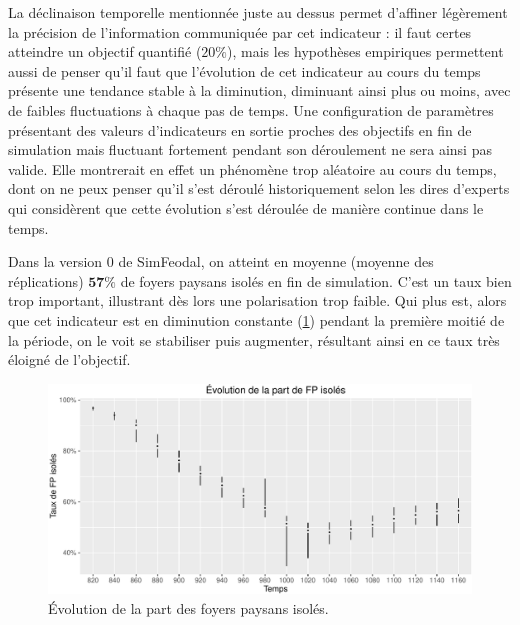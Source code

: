 La \og déclinaison temporelle\fg{} mentionnée juste au dessus permet d'affiner légèrement la précision de l'information communiquée par cet indicateur : il faut certes atteindre un objectif quantifié ($20\%$), mais les hypothèses empiriques permettent aussi de penser qu'il faut que l'évolution de cet indicateur au cours du temps présente une tendance stable à la diminution, diminuant ainsi plus ou moins, avec de faibles fluctuations à chaque pas de temps.
Une configuration de paramètres présentant des valeurs d'indicateurs en sortie proches des objectifs en fin de simulation mais fluctuant fortement pendant son déroulement ne sera ainsi pas valide. Elle montrerait en effet  un phénomène trop aléatoire au cours du temps, dont on ne peux penser qu'il s'est déroulé historiquement selon les dires d'experts qui considèrent que cette évolution s'est déroulée de manière continue dans le temps.

\begin{mdframed}[backgroundcolor=gray!10,footnoteinside=false]
	
	
	Dans la version 0 de SimFeodal, on atteint en moyenne (moyenne des réplications) $\textbf{57\%}$ de foyers paysans isolés en fin de simulation.
	C'est un taux bien trop important, illustrant dès lors une polarisation trop faible. Qui plus est, alors que cet indicateur est en diminution constante (\cref{fig:taux-isoles-v0}) pendant la première moitié de la période, on le voit se stabiliser puis augmenter, résultant ainsi en ce taux très éloigné de l'objectif.
\end{mdframed}

\begin{figure}[H]
	\captionsetup{width=\linewidth}
	\includegraphics[width=\linewidth]{img/resultats/v0_taux_FP_isoles.pdf}
	\caption{Évolution de la part des foyers paysans isolés.} 
	\label{fig:taux-isoles-v0} 
\end{figure}

